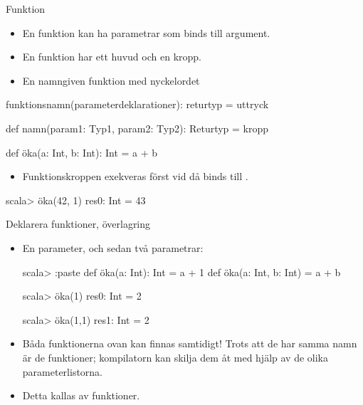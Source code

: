

\begin{Slide}{Funktion}
\setlength{\leftmargini}{0pt}
\begin{itemize}
  \item En funktion kan ha parametrar som binds till argument.
  \item En funktion har ett huvud och en kropp.
  \item En namngiven funktion  med nyckelordet 
\end{itemize}


 funktionsnamn(parameterdeklarationer): returtyp = uttryck

\vspace{1em}

\begin{Code}
def namn(param1: Typ1, param2: Typ2): Returtyp = kropp
\end{Code}

\pause

\begin{Code}
def öka(a: Int, b: Int): Int = a + b
\end{Code}

\setlength{\leftmargini}{0pt}
\begin{itemize}
  \item Funktionskroppen exekveras först vid  då  binds till .
\end{itemize}

\begin{REPL}
scala> öka(42, 1)
res0: Int = 43
\end{REPL}


\end{Slide}


\begin{Slide}{Deklarera funktioner, överlagring}
\begin{itemize}
\item En parameter, och sedan två parametrar:
\begin{REPL}
scala> :paste
  def öka(a: Int): Int = a + 1
  def öka(a: Int, b: Int) = a + b

scala> öka(1)
res0: Int = 2

scala> öka(1,1)
res1: Int = 2

\end{REPL}
\item Båda funktionerna ovan kan finnas samtidigt! Trots att de har samma namn är de  funktioner; kompilatorn kan skilja dem åt med hjälp av de olika parameterlistorna.

\item Detta kallas   av funktioner.

\end{itemize}
\end{Slide}


